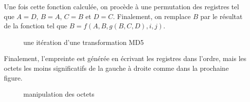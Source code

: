 \documentclass[11pt]{article}
\begin{document}
Une fois cette fonction calculée, on procède à une permutation des registres tel que $A=D$, $B=A$, $C=B$ et $D=C$. Finalement, on remplace $B$ par le résultat de la fonction tel que $B=f(A, B, g(B, C, D), i, j)$.
\begin{figure}[H]
  \centering
  \caption{une itération d'une transformation MD5}
  
\end{figure}

Finalement, l'empreinte est générée en écrivant les registres dans l'ordre, mais les octets les moins significatifs de la gauche à droite comme dans la prochaine figure.
\begin{figure}[H]
  \centering
  \caption{manipulation des octets}
  \makebox[\textwidth]{}
\end{figure}

\printbibliography
\end{document}
